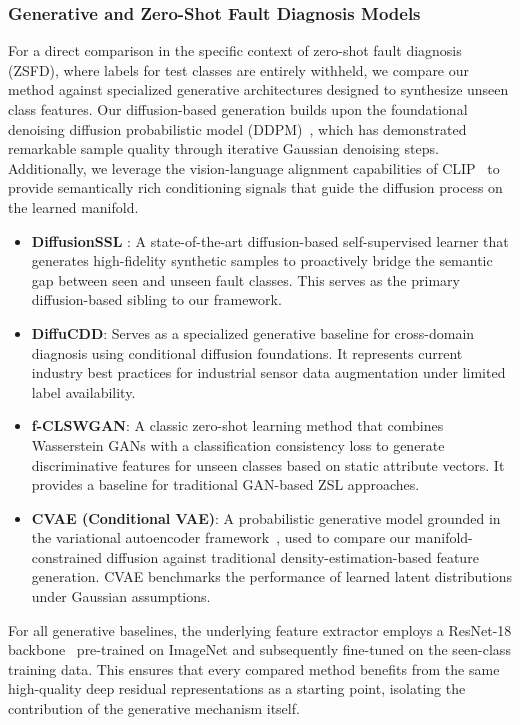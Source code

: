 \subsubsection{Generative and Zero-Shot Fault Diagnosis Models}
For a direct comparison in the specific context of zero-shot fault diagnosis (ZSFD), where labels for test classes are entirely withheld, we compare our method against specialized generative architectures designed to synthesize unseen class features. Our diffusion-based generation builds upon the foundational denoising diffusion probabilistic model (DDPM)~\cite{ho2020denoising}, which has demonstrated remarkable sample quality through iterative Gaussian denoising steps. Additionally, we leverage the vision-language alignment capabilities of CLIP~\cite{radford2021learning} to provide semantically rich conditioning signals that guide the diffusion process on the learned manifold.
\begin{itemize}
    \item \textbf{DiffusionSSL} \cite{li2023diffusionssl}: A state-of-the-art diffusion-based self-supervised learner that generates high-fidelity synthetic samples to proactively bridge the semantic gap between seen and unseen fault classes. This serves as the primary diffusion-based sibling to our framework.
    \item \textbf{DiffuCDD}: Serves as a specialized generative baseline for cross-domain diagnosis using conditional diffusion foundations. It represents current industry best practices for industrial sensor data augmentation under limited label availability.
    \item \textbf{f-CLSWGAN}: A classic zero-shot learning method that combines Wasserstein GANs with a classification consistency loss to generate discriminative features for unseen classes based on static attribute vectors. It provides a baseline for traditional GAN-based ZSL approaches.
    \item \textbf{CVAE (Conditional VAE)}: A probabilistic generative model grounded in the variational autoencoder framework~\cite{kingma2013auto}, used to compare our manifold-constrained diffusion against traditional density-estimation-based feature generation. CVAE benchmarks the performance of learned latent distributions under Gaussian assumptions.
\end{itemize}

For all generative baselines, the underlying feature extractor employs a ResNet-18 backbone~\cite{he2016deep} pre-trained on ImageNet and subsequently fine-tuned on the seen-class training data. This ensures that every compared method benefits from the same high-quality deep residual representations as a starting point, isolating the contribution of the generative mechanism itself.

